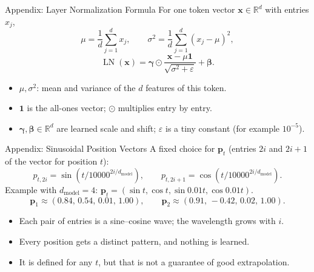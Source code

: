 \documentclass{ntuabeamer}
\begin{document}
\begin{frame}{Appendix: Layer Normalization Formula}
  For one token vector $\mathbf x\in\mathbb R^d$ with entries $x_j$,
  \[
    \mu=\frac1d\sum_{j=1}^{d}x_j,
    \qquad
    \sigma^2=\frac1d\sum_{j=1}^{d}(x_j-\mu)^2,
  \]
  \[
    \operatorname{LN}(\mathbf x)
    =\boldsymbol\gamma\odot
      \frac{\mathbf x-\mu\mathbf 1}{\sqrt{\sigma^2+\varepsilon}}
      +\boldsymbol\beta.
  \]
  \begin{itemize}
    \item $\mu,\sigma^2$: mean and variance of the $d$ features of this token.
    \item $\mathbf 1$ is the all-ones vector; $\odot$ multiplies entry by entry.
    \item $\boldsymbol\gamma,\boldsymbol\beta\in\mathbb R^d$ are learned scale and shift; $\varepsilon$ is a tiny constant (for example $10^{-5}$).
  \end{itemize}
\end{frame}

\begin{frame}{Appendix: Sinusoidal Position Vectors}
  A fixed choice for $\mathbf p_t$ (entries $2i$ and $2i{+}1$ of the vector for position $t$):
  \[
    p_{t,2i}=\sin\!\left(t/10000^{2i/d_{\text{model}}}\right),
    \qquad
    p_{t,2i+1}=\cos\!\left(t/10000^{2i/d_{\text{model}}}\right).
  \]
  Example with $d_{\text{model}}=4$: $\mathbf p_t=(\sin t,\cos t,\sin 0.01t,\cos 0.01t)$.
  \[
    \mathbf p_1\approx(0.84,\,0.54,\,0.01,\,1.00),\qquad
    \mathbf p_2\approx(0.91,\,-0.42,\,0.02,\,1.00).
  \]
  \begin{itemize}
    \item Each pair of entries is a sine--cosine wave; the wavelength grows with $i$.
    \item Every position gets a distinct pattern, and nothing is learned.
    \item It is defined for any $t$, but that is not a guarantee of good extrapolation.
  \end{itemize}
\end{frame}
\end{document}
